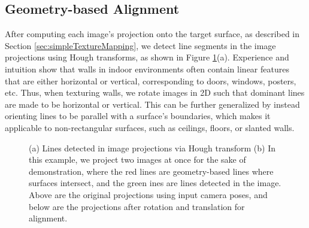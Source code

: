 \documentclass[]{spie}  %
\begin{document}
\subsection{Geometry-based Alignment}
\label{sec:geometryAlignment}
After computing each image's projection onto the target surface, as
described in Section \ref{sec:simpleTextureMapping}, we detect line
segments in the image projections using Hough transforms, as shown in
Figure \ref{fig:geometryAlignment}(a). Experience and intuition show
that walls in indoor environments often contain linear features that
are either horizontal or vertical, corresponding to doors, windows,
posters, etc. Thus, when texturing walls, we rotate images in 2D such
that dominant lines are made to be horizontal or vertical. This can be
further generalized by instead orienting lines to be parallel with a
surface's boundaries, which makes it applicable to non-rectangular
surfaces, such as ceilings, floors, or slanted walls.

\begin{figure}
  \centering
  \hspace{0.4 cm}
  \caption{(a) Lines detected in image projections via Hough transform
    (b) In this example, we project two images at once for the sake of
    demonstration, where the red lines are geometry-based lines where
    surfaces intersect, and the green ines are lines detected in the
    image. Above are the original projections using input camera
    poses, and below are the projections after rotation and
    translation for alignment.}
  \label{fig:geometryAlignment}
\end{figure}
\end{document}
